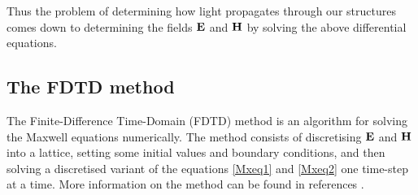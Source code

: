 Thus the problem of determining how light propagates through our structures comes down to determining the fields $\mathbf{E}$ and $\mathbf{H}$ by solving the above differential equations.

\subsection{The FDTD method}

The Finite-Difference Time-Domain (FDTD) method is an algorithm for solving the Maxwell equations numerically. The method consists of discretising $\mathbf{E}$ and $\mathbf{H}$ into a lattice, setting some initial values and boundary conditions, and then solving a discretised variant of the equations \eqref{Mxeq1} and \eqref{Mxeq2}  one time-step at a time. More information on the method can be found in references .